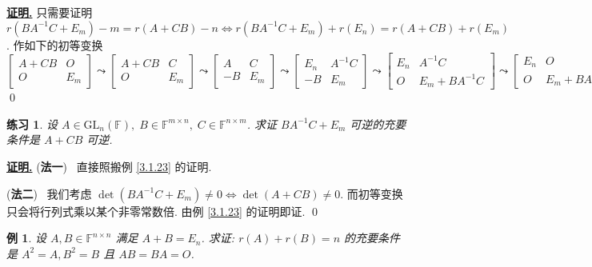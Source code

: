 \documentclass[10pt,openany]{article}
\theoremstyle{thmstyle} %
\newtheorem{practice}{练习}[section]
\theoremstyle{defstyle} %
\theoremstyle{prostyle} %
\theoremstyle{exastyle}
\newtheorem{example}[theorem]{例}
\theoremstyle{remstyle}
\renewenvironment{proof}[1][证明]{\par\underline{\textbf{#1.}} \;\fangsong}{\qed\par}
\newcommand{\F}{\mathbb{F}}
\newcommand{\gfn}{\text{GL}_n(\mathbb{F})}
\newcommand{\n}{^{n \times n}}
\newcommand{\mn}{^{m \times n}}
\newcommand{\nm}{^{n \times m}}
\begin{document}
\begin{proof}
	只需要证明 \( r(BA^{-1}C+E_m)-m=r(A+CB)-n \Leftrightarrow r(BA^{-1}C+E_m)+r(E_n)=r(A+CB)+r(E_m) \). 作如下的初等变换
	\[ \begin{bmatrix}
		A+CB & O \\
		O & E_m
	\end{bmatrix} \leadsto \begin{bmatrix}
	A+CB & C \\
	O & E_m
	\end{bmatrix} \leadsto \begin{bmatrix}
	A & C \\
	-B & E_m
	\end{bmatrix} \leadsto \begin{bmatrix}
	E_n & A^{-1}C \\
	-B & E_m
	\end{bmatrix} \leadsto \begin{bmatrix}
	E_n & A^{-1}C \\
	O & E_m+BA^{-1}C
	\end{bmatrix} \leadsto \begin{bmatrix}
	E_n & O \\
	O & E_m+BA^{-1}C
	\end{bmatrix}. \]
\end{proof}

\begin{practice}
	设 \( A \in \gfn, \; B \in \F\mn, \; C \in \F\nm \). 求证  
	\( BA^{-1}C + E_m \) 可逆的充要条件是 \( A + CB \) 可逆.
\end{practice}

\begin{proof}
	(\textbf{法一}) \ 直接照搬例 \ref{3.1.23} 的证明.
	
	\vspace{1ex}
	
	(\textbf{法二}) \ 我们考虑 \( \det(BA^{-1}C + E_m) \neq 0 \Leftrightarrow \det(A + CB) \neq 0 \). 而初等变换只会将行列式乘以某个非零常数倍. 由例 \ref{3.1.23} 的证明即证.
\end{proof}

\begin{example} \label{3.1.24}
	设 \(  A, B \in \F\n \) 满足 \( A + B = E_n \). 求证: \( r(A) + r(B) = n \) 的充要条件是  
	\( A^2 = A, B^2 = B \) 且 \( AB = BA = O \).
\end{example}
\end{document}
